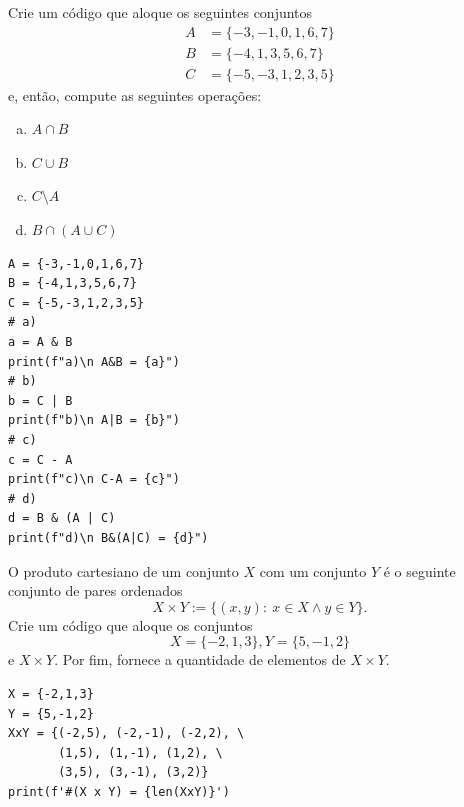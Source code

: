 \begin{exer}
  Crie um código que aloque os seguintes conjuntos
  \begin{align}
    A &= \{-3,-1,0,1,6,7\}\\
    B &= \{-4,1,3,5,6,7\}\\
    C &= \{-5,-3,1,2,3,5\}
  \end{align}
  e, então, compute as seguintes operações:
  \begin{enumerate}[a)]
  \item $A\cap B$\\
  \item $C\cup B$\\
  \item $C\setminus A$\\
  \item $B\cap (A\cup C)$
  \end{enumerate}
\end{exer}
\begin{resp}

\begin{lstlisting}
A = {-3,-1,0,1,6,7}
B = {-4,1,3,5,6,7}
C = {-5,-3,1,2,3,5}
# a)
a = A & B
print(f"a)\n A&B = {a}")
# b)
b = C | B
print(f"b)\n A|B = {b}")
# c)
c = C - A
print(f"c)\n C-A = {c}")
# d)
d = B & (A | C)
print(f"d)\n B&(A|C) = {d}")
\end{lstlisting}

\end{resp}

\begin{exer}
  O produto cartesiano{\descartes} de um conjunto $X$ com um conjunto $Y$ é o seguinte conjunto de pares ordenados
  \begin{equation}
    X\times Y := \{(x,y):~x\in X \land y\in Y\}.
  \end{equation}
  Crie um código que aloque os conjuntos
  \begin{equation}
    X = \{-2,1,3\},
    Y = \{5,-1,2\}
  \end{equation}
  e $X\times Y$. Por fim, fornece a quantidade de elementos de $X\times Y$.
\end{exer}
\begin{resp}

\begin{lstlisting}
X = {-2,1,3}
Y = {5,-1,2}
XxY = {(-2,5), (-2,-1), (-2,2), \
       (1,5), (1,-1), (1,2), \
       (3,5), (3,-1), (3,2)}
print(f'#(X x Y) = {len(XxY)}')
\end{lstlisting}

\end{resp}

